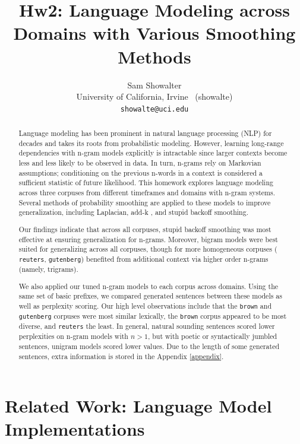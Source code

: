 \documentclass[11pt,a4paper]{article}
\title{Hw2: Language Modeling across Domains with Various Smoothing Methods}
\author{Sam Showalter \\
  University of California, Irvine \ (showalte) \\  
\texttt{showalte@uci.edu}}
\date{}
\begin{document}
\maketitle
\begin{abstract} 
  Language modeling has been prominent in natural language processing (NLP) for
  decades and takes its roots from probabilistic modeling. 
  However, learning long-range dependencies with n-gram models explicitly is intractable since
  larger contexts become less and less likely to be observed in data. In turn, n-grams rely on Markovian assumptions;
  conditioning on the previous n-words in a context is considered a sufficient statistic of future likelihood. This homework 
  explores language modeling across three corpuses from different timeframes and domains with n-gram systems. Several
  methods of probability smoothing are applied to these models to improve generalization, including Laplacian, add-k
  , and stupid backoff \cite{brants2007large} smoothing. 

  Our findings indicate that across all corpuses, stupid backoff smoothing was most effective at ensuring generalization for n-grams. Moreover, 
  bigram models were best suited for generalizing across all corpuses, though for more homogeneous corpuses ( \texttt{reuters}, \texttt{gutenberg})
  benefited from additional context via higher order n-grams (namely, trigrams).



  We also applied our tuned n-gram models to each corpus across domains. Using the same set of basic 
  prefixes, we compared generated sentences between these models as well as perplexity scoring.
  Our high level observations include that the \texttt{brown} and \texttt{gutenberg} corpuses were most similar lexically,
  the \texttt{brown} corpus appeared to be most diverse, and \texttt{reuters} the least. In general, natural sounding sentences scored lower perplexities on 
  n-gram models with $ n > 1$, but with poetic or syntactically jumbled sentences, unigram models scored lower values. Due to the length of 
  some generated sentences, extra information is stored in the Appendix \ref{appendix}. 
\end{abstract}

\section{Related Work: Language Model Implementations}
\end{document}
